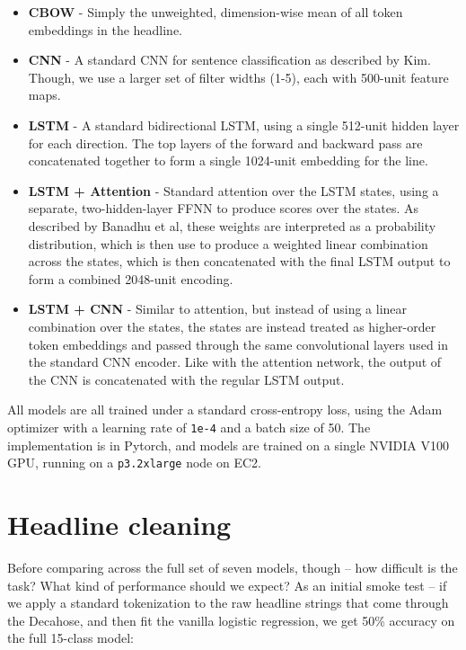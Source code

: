 \documentclass{scrartcl}
\begin{document}
\begin{itemize}
\item \textbf{CBOW} - Simply the unweighted, dimension-wise mean of all token embeddings in the headline.

\item \textbf{CNN} - A standard CNN for sentence classification as described by Kim.\cite{D14-1181} Though, we use a larger set of filter widths (1-5), each with 500-unit feature maps.

\item \textbf{LSTM} - A standard bidirectional LSTM, using a single 512-unit hidden layer for each direction. The top layers of the forward and backward pass are concatenated together to form a single 1024-unit embedding for the line.

\item \textbf{LSTM + Attention} - Standard attention over the LSTM states, using a separate, two-hidden-layer FFNN to produce scores over the states. As described by Banadhu et al, these weights are interpreted as a probability distribution, which is then use to produce a weighted linear combination across the states, which is then concatenated with the final LSTM output to form a combined 2048-unit encoding.

\item \textbf{LSTM + CNN} - Similar to attention, but instead of using a linear combination over the states, the states are instead treated as higher-order token embeddings and passed through the same convolutional layers used in the standard CNN encoder. Like with the attention network, the output of the CNN is concatenated with the regular LSTM output.
\end{itemize}

All models are all trained under a standard cross-entropy loss, using the Adam optimizer with a learning rate of \texttt{1e-4} and a batch size of 50. The implementation is in Pytorch,\cite{paszke2017automatic} and models are trained on a single NVIDIA V100 GPU, running on a \texttt{p3.2xlarge} node on EC2.

\section{Headline cleaning}

Before comparing across the full set of seven models, though -- how difficult is the task? What kind of performance should we expect? As an initial smoke test -- if we apply a standard tokenization to the raw headline strings that come through the Decahose, and then fit the vanilla logistic regression, we get 50\% accuracy on the full 15-class model:
\end{document}
